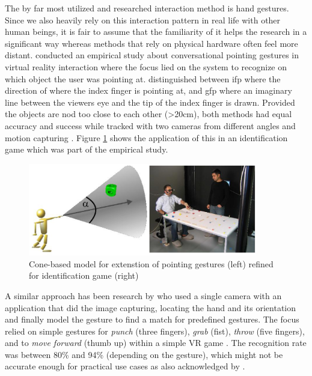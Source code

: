 The by far most utilized and researched interaction method is hand gestures. Since we also heavily rely on this interaction pattern in real life with other human beings, it is fair to assume that the familiarity of it helps the research in a significant way whereas methods that rely on physical hardware often feel more distant. \newline
\cite{Pfeiffer2008} conducted an empirical study about conversational pointing gestures in virtual reality interaction where the focus lied on the system to recognize on which object the user was pointing at. \cite{Pfeiffer2008} distinguished between \gls{ifp} where the direction of where the index finger is pointing at, and \gls{gfp} where an imaginary line between the viewers eye and the tip of the index finger is drawn. Provided the objects are nod too close to each other (>20cm), both methods had equal accuracy and success while tracked with two cameras from different angles and motion capturing \citep{Pfeiffer2008}. Figure \ref{fig:pointinggesture} shows the application of this in an identification game which was part of the empirical study.
\begin{figure}[h]
	\begin{center}
		\includegraphics[width=10cm]{03_Figures/05_LitReview/Pfeiffer2008_Pointing.png}
		\caption[Cone-based model for extenstion of pointing gestures refined for identification game]{Cone-based model for extenstion of pointing gestures (left) refined for identification game (right) \citep{Pfeiffer2008}}
		\label{fig:pointinggesture}
	\end{center}
\end{figure}
\newline
A similar approach has been research by \cite{Rautaray2011} who used a single camera with an application that did the image capturing, locating the hand and its orientation and finally model the gesture to find a match for predefined gestures. The focus relied on simple gestures for \textit{punch} (three fingers), \textit{grab} (fist), \textit{throw} (five fingers), and to \textit{move forward} (thumb up) within a simple VR game \citep{Rautaray2011}. The recognition rate was between 80\% and 94\% (depending on the gesture), which might not be accurate enough for practical use cases as also acknowledged by \cite{Rautaray2011}. \newline
